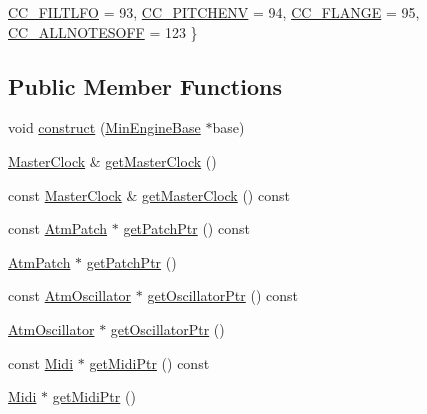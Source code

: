 \begin{DoxyCompactItemize}
\hyperlink{class_min_engine_a502a9d9ffc56986c672c45ca8e64772aad9a6eea0b78f68d8976f62ab773b22e1}{C\+C\+\_\+\+F\+I\+L\+T\+L\+FO} = 93, 
\hyperlink{class_min_engine_a502a9d9ffc56986c672c45ca8e64772aa67e827b45758cf7e4f3e5990a0e0152f}{C\+C\+\_\+\+P\+I\+T\+C\+H\+E\+NV} = 94, 
\hyperlink{class_min_engine_a502a9d9ffc56986c672c45ca8e64772aa131217a7dadb1074bc2f034c64082f4e}{C\+C\+\_\+\+F\+L\+A\+N\+GE} = 95, 
\newline
\hyperlink{class_min_engine_a502a9d9ffc56986c672c45ca8e64772aa6fc07e276ce3bacc6eee4433dab9fb45}{C\+C\+\_\+\+A\+L\+L\+N\+O\+T\+E\+S\+O\+FF} = 123
 \}
\end{DoxyCompactItemize}
\subsection*{Public Member Functions}
\begin{DoxyCompactItemize}
\item 
void \hyperlink{class_min_engine_a9e00c7c1943063e4b707384738221365}{construct} (\hyperlink{class_min_engine_base}{Min\+Engine\+Base} $\ast$base)
\item 
\hyperlink{class_master_clock}{Master\+Clock} \& \hyperlink{class_min_engine_a4d41a91ebf44df8b8d6912293a3a3452}{get\+Master\+Clock} ()
\item 
const \hyperlink{class_master_clock}{Master\+Clock} \& \hyperlink{class_min_engine_a1f5e35caaf19b4a4319a5ce26dfc34b3}{get\+Master\+Clock} () const
\item 
const \hyperlink{class_atm_patch}{Atm\+Patch} $\ast$ \hyperlink{class_min_engine_a800de17fbe50c5f2aceab2999f3b8be1}{get\+Patch\+Ptr} () const
\item 
\hyperlink{class_atm_patch}{Atm\+Patch} $\ast$ \hyperlink{class_min_engine_ae8bf10e7e525b7474aa5b5f9a4aee7d9}{get\+Patch\+Ptr} ()
\item 
const \hyperlink{class_atm_oscillator}{Atm\+Oscillator} $\ast$ \hyperlink{class_min_engine_a29cf0e250614672a5619584db86c5618}{get\+Oscillator\+Ptr} () const
\item 
\hyperlink{class_atm_oscillator}{Atm\+Oscillator} $\ast$ \hyperlink{class_min_engine_ac1ffbd6265f3e251f447d866518e60ef}{get\+Oscillator\+Ptr} ()
\item 
const \hyperlink{class_midi}{Midi} $\ast$ \hyperlink{class_min_engine_ab6c3bb750ae223f9b31b94bb2f21f082}{get\+Midi\+Ptr} () const
\item 
\hyperlink{class_midi}{Midi} $\ast$ \hyperlink{class_min_engine_a5584f12b5e32a683a6e542fcc3b2ef30}{get\+Midi\+Ptr} ()

\end{DoxyCompactItemize}
